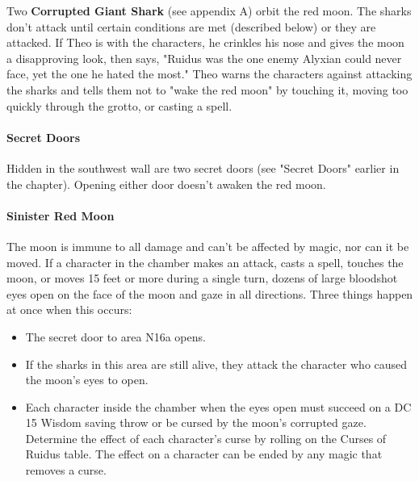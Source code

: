 \documentclass[10pt,a4,twoside,twocolumn,openany,nodeprecatedcode]{dndbook}
\begin{document}
Two \textbf{Corrupted Giant Shark} (see appendix A) orbit the red moon. The sharks don't attack until certain conditions are met (described below) or they are attacked.
If Theo is with the characters, he crinkles his nose and gives the moon a disapproving look, then says, "Ruidus was the one enemy Alyxian could never face, yet the one he hated the most." Theo warns the characters against attacking the sharks and tells them not to "wake the red moon" by touching it, moving too quickly through the grotto, or casting a spell.
\paragraph{Secret Doors}
Hidden in the southwest wall are two secret doors (see "Secret Doors" earlier in the chapter). Opening either door doesn't awaken the red moon.
\paragraph{Sinister Red Moon}
The moon is immune to all damage and can't be affected by magic, nor can it be moved. If a character in the chamber makes an attack, casts a spell, touches the moon, or moves 15 feet or more during a single turn, dozens of large bloodshot eyes open on the face of the moon and gaze in all directions. Three things happen at once when this occurs:
\begin{itemize}

\item The secret door to area N16a opens.
\item If the sharks in this area are still alive, they attack the character who caused the moon's eyes to open.
\item Each character inside the chamber when the eyes open must succeed on a DC 15 Wisdom saving throw or be cursed by the moon's corrupted gaze. Determine the effect of each character's curse by rolling on the Curses of Ruidus table. The effect on a character can be ended by any magic that removes a curse.
\end{itemize}
\end{document}
